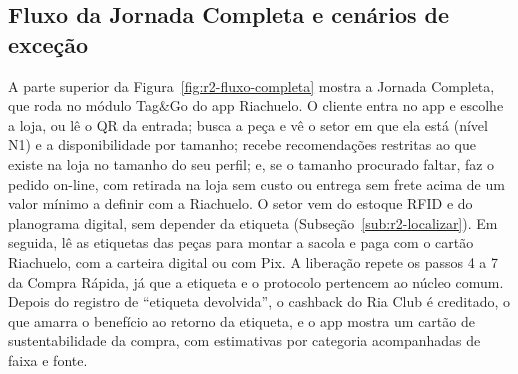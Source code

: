 \begin{figure}[htbp]
{%
    }
\end{figure}

\subsection{Fluxo da Jornada Completa e cenários de exceção}

A parte superior da Figura~\ref{fig:r2-fluxo-completa} mostra a Jornada Completa, que roda no módulo Tag\&Go do app Riachuelo. O cliente entra no app e escolhe a loja, ou lê o QR da entrada; busca a peça e vê o setor em que ela está (nível N1) e a disponibilidade por tamanho; recebe recomendações restritas ao que existe na loja no tamanho do seu perfil; e, se o tamanho procurado faltar, faz o pedido on-line, com retirada na loja sem custo ou entrega sem frete acima de um valor mínimo a definir com a Riachuelo. O setor vem do estoque RFID e do planograma digital, sem depender da etiqueta (Subseção~\ref{sub:r2-localizar}). Em seguida, lê as etiquetas das peças para montar a sacola e paga com o cartão Riachuelo, com a carteira digital ou com Pix. A liberação repete os passos 4 a 7 da Compra Rápida, já que a etiqueta e o protocolo pertencem ao núcleo comum. Depois do registro de ``etiqueta devolvida'', o cashback do Ria Club é creditado, o que amarra o benefício ao retorno da etiqueta, e o app mostra um cartão de sustentabilidade da compra, com estimativas por categoria acompanhadas de faixa e fonte.

